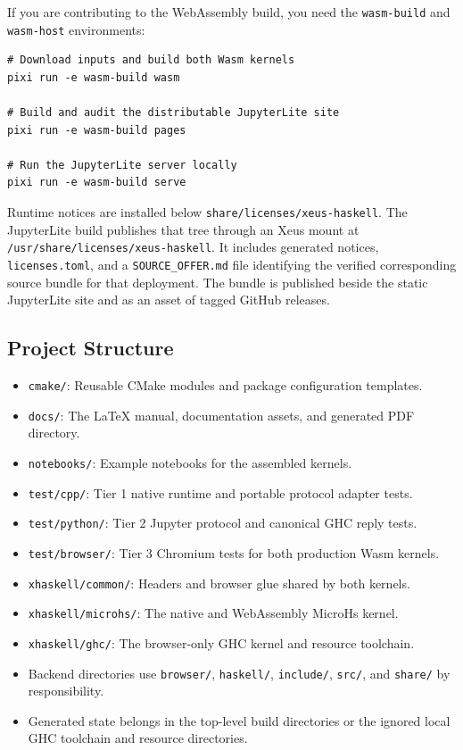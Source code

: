 \documentclass[11pt]{scrartcl}
\begin{document}
If you are contributing to the WebAssembly build, you need the \texttt{wasm-build} and \texttt{wasm-host} environments:
\begin{verbatim}
# Download inputs and build both Wasm kernels
pixi run -e wasm-build wasm

# Build and audit the distributable JupyterLite site
pixi run -e wasm-build pages

# Run the JupyterLite server locally
pixi run -e wasm-build serve
\end{verbatim}

Runtime notices are installed below \texttt{share/licenses/xeus-haskell}.
The JupyterLite build publishes that tree through an Xeus mount at
\texttt{/usr/share/licenses/xeus-haskell}. It includes generated notices, \texttt{licenses.toml},
and a \texttt{SOURCE\_OFFER.md} file identifying the verified corresponding
source bundle for that deployment. The bundle is published beside the static
JupyterLite site and as an asset of tagged GitHub releases.


\subsection{Project Structure}


\begin{itemize}
\item \texttt{cmake/}: Reusable CMake modules and package configuration templates.
\item \texttt{docs/}: The LaTeX manual, documentation assets, and generated PDF directory.
\item \texttt{notebooks/}: Example notebooks for the assembled kernels.
\item \texttt{test/cpp/}: Tier 1 native runtime and portable protocol adapter tests.
\item \texttt{test/python/}: Tier 2 Jupyter protocol and canonical GHC reply tests.
\item \texttt{test/browser/}: Tier 3 Chromium tests for both production Wasm kernels.
\item \texttt{xhaskell/common/}: Headers and browser glue shared by both kernels.
\item \texttt{xhaskell/microhs/}: The native and WebAssembly MicroHs kernel.
\item \texttt{xhaskell/ghc/}: The browser-only GHC kernel and resource toolchain.
\item Backend directories use \texttt{browser/}, \texttt{haskell/},
  \texttt{include/}, \texttt{src/}, and \texttt{share/} by responsibility.
\item Generated state belongs in the top-level build directories or the
  ignored local GHC toolchain and resource directories.
\end{itemize}
\end{document}
